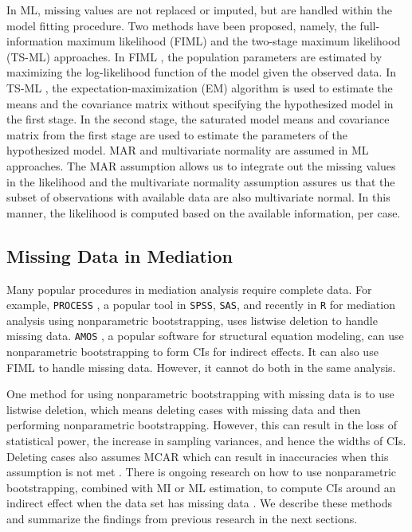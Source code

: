 \documentclass[man]{apa7}\usepackage[]{graphicx}\usepackage[]{xcolor}
\begin{document}
In ML,
missing values are not replaced or imputed,
but are handled within the model fitting procedure.
Two methods have been proposed,
namely,
the full-information maximum likelihood (FIML)
and the two-stage maximum likelihood (TS-ML) approaches.
In FIML
\parencite{Lib-Missing-Data-Arbuckle-1996},
the population parameters are estimated
by maximizing the log-likelihood function of the model given the observed data.
In TS-ML
\parencite{Lib-Missing-Data-Yuan-2000},
the expectation-maximization (EM) algorithm
is used to estimate the means and the covariance matrix
without specifying the hypothesized model in the first stage.
In the second stage,
the saturated model means and covariance matrix
from the first stage are used to estimate the parameters of the
hypothesized model.
MAR and multivariate normality are assumed in ML approaches.
The MAR assumption allows us to integrate out the missing values in the likelihood
and the multivariate normality assumption assures us that the subset of observations with available data are also multivariate normal.
In this manner,
the likelihood is computed based on the available information,
per case.

\subsection{Missing Data in Mediation}

Many popular procedures in mediation analysis
require complete data.
For example,
\texttt{PROCESS}
\parencite{Lib-Mediation-Books-Hayes-2022,
Lib-Mediation-Bootstrap-Preacher-2004},
a popular tool in
\texttt{SPSS},
\texttt{SAS},
and recently in
\texttt{R}
for mediation analysis using nonparametric bootstrapping,
uses listwise deletion to handle missing data.
\texttt{AMOS}
\parencite{Lib-Structural-Equation-Modeling-Software-Manuals-Arbuckle-2021},
a popular software for structural equation modeling,
can use nonparametric bootstrapping
to form CIs for indirect effects.
It can also use FIML to handle missing data.
However,
it cannot do both in the same analysis.

One method for using nonparametric bootstrapping with missing data
is to use listwise deletion,
which means deleting cases with missing data
and then performing nonparametric bootstrapping. 
However,
this can result in the loss of statistical power,
the increase in sampling variances,
and hence the widths of CIs.
Deleting cases also assumes MCAR
which can result in inaccuracies
when this assumption is not met
\parencite{Lib-Missing-Data-Rubin-1976}.
There is ongoing research on how to use nonparametric bootstrapping,
combined with MI or ML estimation,
to compute CIs around an indirect effect
when the data set has missing data
\parencite{Lib-Mediation-Missing-Data-Zhang-2012,
	Lib-Mediation-Missing-Data-Wu-2013,
Lib-Mediation-Missing-Data-Zhang-2015}.
We describe these methods and summarize the findings
from previous research in the next sections.
\end{document}
